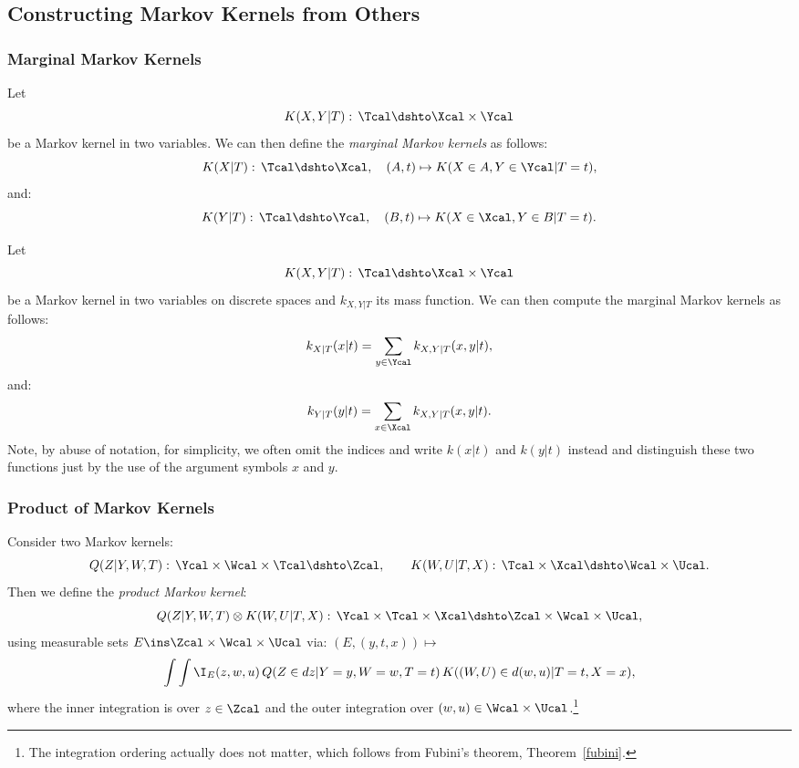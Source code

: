 \subsection{Constructing Markov Kernels from Others}


\subsubsection{Marginal Markov Kernels}

\begin{Def}
    \label{def-marginal-markov-kernels}
    Let 
    \[K(X,Y|T):\,\Tcal \dshto  \Xcal \times \Ycal \]
    be a Markov kernel in two variables.
    We can then define the \emph{marginal Markov kernels} as follows:
    \[ K(X|T):\, \Tcal \dshto \Xcal,\quad (A,t) \mapsto K(X \in A, Y \in \Ycal|T=t),  \]
    and:
    \[ K(Y|T):\, \Tcal \dshto \Ycal,\quad (B,t) \mapsto K(X \in \Xcal, Y \in B|T=t).  \]
\end{Def}

\begin{Eg}
    Let 
    \[K(X,Y|T):\,\Tcal \dshto  \Xcal \times \Ycal \]
    be a Markov kernel in two variables on discrete spaces and $k_{X,Y|T}$ its mass function.
    We can then compute the marginal Markov kernels as follows:
    \[  k_{X|T}(x|t) = \sum_{y \in \Ycal} k_{X,Y|T}(x,y|t), \]
    and:
    \[  k_{Y|T}(y|t) = \sum_{x \in \Xcal} k_{X,Y|T}(x,y|t). \]
    Note, by abuse of notation, for simplicity, we often omit the indices and write $k(x|t)$ and $k(y|t)$ instead 
    and distinguish these two functions just by the use of the argument symbols $x$ and $y$.
\end{Eg}


\subsubsection{Product of Markov Kernels}

\begin{Def}
    \label{def-product-markov-kernels}
    Consider two Markov kernels:
    \[ Q(Z|Y,W,T):\, \Ycal \times \Wcal\times \Tcal \dshto \Zcal,\qquad  
    K(W,U|T,X):\, \Tcal \times \Xcal \dshto \Wcal \times \Ucal. \]
    Then we define the \emph{product Markov kernel}:
    \[ Q(Z|Y,W,T) \otimes K(W,U|T,X) :\, \Ycal \times  \Tcal \times \Xcal \dshto \Zcal \times \Wcal \times \Ucal, \]
    using  measurable sets $E \ins \Zcal \times \Wcal \times \Ucal$ via: $(E,(y,t,x)) \mapsto $
    \[\int\int \I_E(z,w,u)\, Q(Z \in dz|Y=y,W=w,T=t) \, K((W,U) \in d(w,u)|T=t,X=x),\]
  where the inner integration is over $z \in \Zcal$ and the outer integration over $(w,u) \in \Wcal\times \Ucal$.\footnote{The integration ordering actually does not matter, which follows from Fubini's theorem, Theorem~\ref{fubini}.}
\end{Def}

